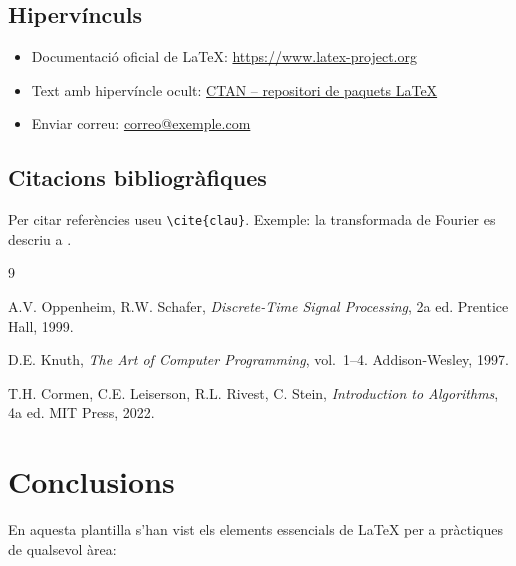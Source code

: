 \documentclass[informe, catalan]{practicaitic}
\theoremstyle{definition}
\theoremstyle{remark}
\begin{document}
\subsection{Hipervínculs}

\begin{itemize}
  \item Documentació oficial de LaTeX: \url{https://www.latex-project.org}
  \item Text amb hipervíncle ocult: \href{https://ctan.org}{CTAN -- repositori de paquets LaTeX}
  \item Enviar correu: \href{mailto:correo@exemple.com}{correo@exemple.com}
\end{itemize}

\subsection{Citacions bibliogràfiques}

Per citar referències useu \texttt{\textbackslash cite\{clau\}}.
Exemple: la transformada de Fourier es descriu a \cite{oppenheim1999}.

\begin{thebibliography}{9}

  A.V. Oppenheim, R.W. Schafer,
  \textit{Discrete-Time Signal Processing}, 2a ed.
  Prentice Hall, 1999.

  D.E. Knuth,
  \textit{The Art of Computer Programming}, vol.~1--4.
  Addison-Wesley, 1997.

  T.H. Cormen, C.E. Leiserson, R.L. Rivest, C. Stein,
  \textit{Introduction to Algorithms}, 4a ed.
  MIT Press, 2022.

\end{thebibliography}


\section{Conclusions}

En aquesta plantilla s'han vist els elements essencials de LaTeX per a pràctiques
de qualsevol àrea:
\end{document}
